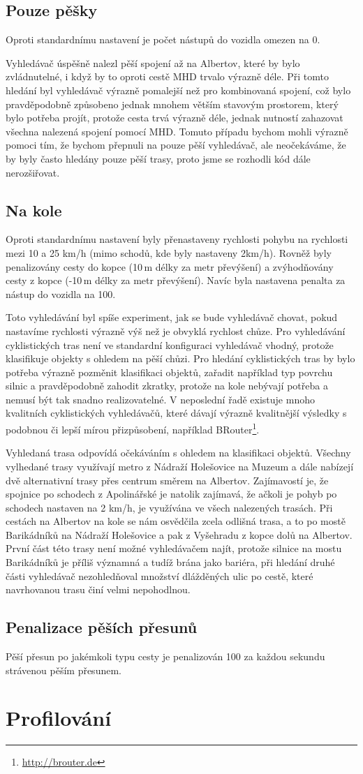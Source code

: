 \subsection{Pouze pěšky}
Oproti standardnímu nastavení je počet nástupů do vozidla omezen na 0.

Vyhledávač úspěšně nalezl pěší spojení až na Albertov, které by bylo
zvládnutelné, i když by to oproti cestě MHD trvalo výrazně déle. Při tomto
hledání byl vyhledávač výrazně pomalejší než pro kombinovaná spojení, což bylo
pravděpodobně způsobeno jednak mnohem větším stavovým prostorem, který bylo
potřeba projít, protože cesta trvá výrazně déle, jednak nutností zahazovat
všechna nalezená spojení pomocí MHD. Tomuto případu bychom mohli výrazně pomoci
tím, že bychom přepnuli na pouze pěší vyhledávač, ale neočekáváme, že by byly
často hledány pouze pěší trasy, proto jsme se rozhodli kód dále nerozšiřovat.
\subsection{Na kole}
Oproti standardnímu nastavení byly přenastaveny rychlosti pohybu na rychlosti
mezi 10 a 25 km/h (mimo schodů, kde byly nastaveny 2km/h). Rovněž byly
penalizovány cesty do kopce (10\,m délky za metr převýšení) a zvýhodňovány cesty z
kopce (-10\,m délky za metr převýšení). Navíc byla nastavena penalta za nástup
do vozidla na 100.

Toto vyhledávání byl spíše experiment, jak se bude vyhledávač chovat, pokud
nastavíme rychlosti výrazně výš než je obvyklá rychlost chůze. Pro vyhledávání
cyklistických tras není ve standardní konfiguraci vyhledávač vhodný, protože
klasifikuje objekty s ohledem na pěší chůzi. Pro hledání cyklistických tras by
bylo potřeba výrazně pozměnit klasifikaci objektů, zařadit například typ povrchu
silnic a pravděpodobně zahodit zkratky, protože na kole nebývají potřeba a
nemusí být tak snadno realizovatelné. V neposlední řadě existuje mnoho
kvalitních cyklistických vyhledávačů, které dávají výrazně kvalitnější výsledky
s podobnou či lepší mírou přizpůsobení, například
BRouter\footnote{\url{http://brouter.de}}.

Vyhledaná trasa odpovídá očekáváním s ohledem na klasifikaci objektů. Všechny
vylhedané trasy využívají metro z Nádraží Holešovice na Muzeum a dále nabízejí
dvě alternativní trasy přes centrum směrem na Albertov. Zajímavostí je, že
spojnice po schodech z Apolinářské je natolik zajímavá, že ačkoli je pohyb po
schodech nastaven na 2 km/h, je využívána ve všech nalezených trasách. Při
cestách na Albertov na kole se nám osvědčila zcela odlišná trasa, a to po mostě
Barikádníků na Nádraží Holešovice a pak z Vyšehradu z kopce dolů na Albertov.
První část této trasy není možné vyhledávačem najít, protože silnice na mostu
Barikádníků je příliš významná a tudíž brána jako bariéra, při hledání druhé
části vyhledávač nezohledňoval množství dlážděných ulic po cestě, které
navrhovanou trasu činí velmi nepohodlnou.

\subsection{Penalizace pěších přesunů}
Pěší přesun po jakémkoli typu cesty je penalizován 100 za každou sekundu
strávenou pěším přesunem.

\section{Profilování}
